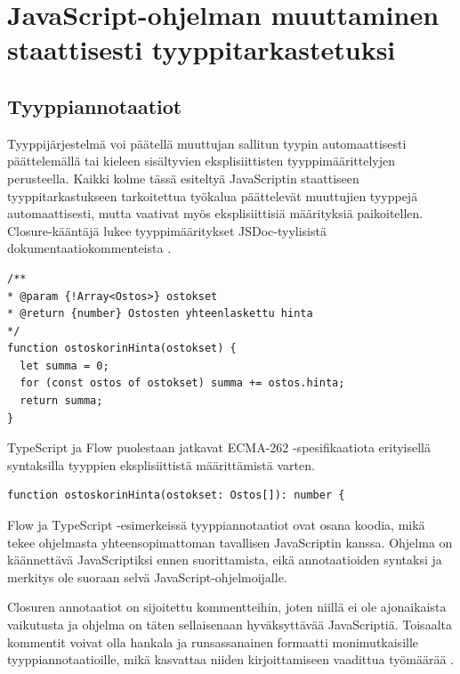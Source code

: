 \chapter{JavaScript-ohjelman muuttaminen staattisesti tyyppitarkastetuksi}

\section{Tyyppiannotaatiot}

Tyyppijärjestelmä voi päätellä muuttujan sallitun tyypin automaattisesti
päättelemällä tai kieleen sisältyvien eksplisiittisten tyyppimäärittelyjen
perusteella. Kaikki kolme tässä esiteltyä JavaScriptin staattiseen
tyyppitarkastukseen tarkoitettua työkalua päättelevät muuttujien tyyppejä automaattisesti, mutta vaativat
myös eksplisiittisiä määrityksiä paikoitellen. 
Closure-kääntäjä lukee
tyyppimääritykset JSDoc-tyylisistä dokumentaatiokommenteista \cite{annotatingJSforClosure}.

\begin{minipage}{\linewidth}
\begin{lstlisting}[caption={Esimerkki Closure-annotaatiosta funktiolle},label={lst:ostoskorin_hinta_clojure}]
/**
* @param {!Array<Ostos>} ostokset
* @return {number} Ostosten yhteenlaskettu hinta
*/
function ostoskorinHinta(ostokset) {
  let summa = 0;
  for (const ostos of ostokset) summa += ostos.hinta;
  return summa;
}
\end{lstlisting}
\end{minipage}
TypeScript ja Flow puolestaan jatkavat ECMA-262 -spesifikaatiota erityisellä syntaksilla
tyyppien eksplisiittistä määrittämistä varten. 

\begin{minipage}{\linewidth}
\begin{lstlisting}[caption={Esimerkki Flow tai TypeScript annotaatiosta funktiolle},label={lst:ostoskorin_hinta_flow}]
function ostoskorinHinta(ostokset: Ostos[]): number {
\end{lstlisting}
\end{minipage}

Flow ja TypeScript -esimerkeissä tyyppiannotaatiot ovat osana koodia, mikä
tekee ohjelmasta yhteensopimattoman tavallisen JavaScriptin kanssa. Ohjelma
on käännettävä JavaScriptiksi ennen suorittamista, eikä annotaatioiden
syntaksi ja merkitys ole suoraan selvä JavaScript-ohjelmoijalle. 

Closuren annotaatiot on sijoitettu kommentteihin, joten niillä ei ole
ajonaikaista vaikutusta ja ohjelma on täten sellaisenaan hyväksyttävää
JavaScriptiä. Toisaalta kommentit voivat olla hankala ja runsassanainen
formaatti monimutkaisille tyyppiannotaatioille, mikä kasvattaa niiden
kirjoittamiseen vaadittua työmäärää \cite{TypeScriptSpec}\cite{TypeScriptatBuild}.

